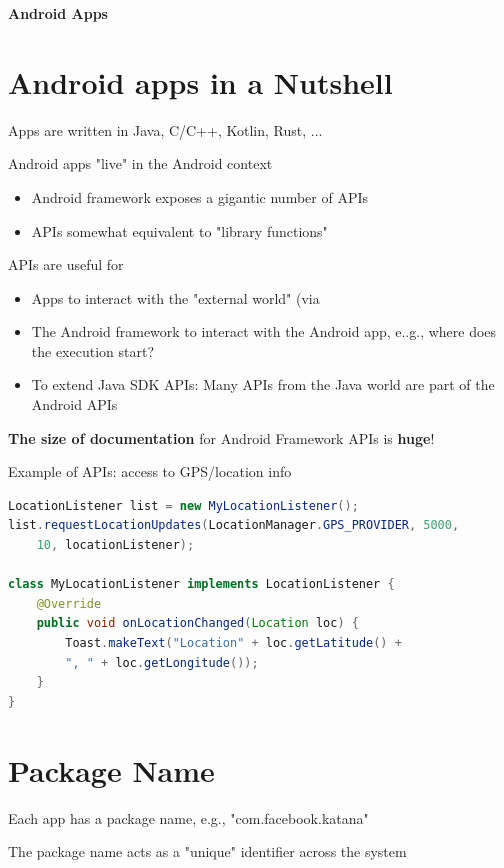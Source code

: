 \documentclass[11pt]{article}
\begin{document}
\newpage
\begin{center}
  {\LARGE \textbf{Android Apps}}
\end{center}
\vspace{0.5cm}

\section*{Android apps in a Nutshell}

Apps are written in Java, C/C++, Kotlin, Rust, ...

Android apps "live" in the Android context
\begin{itemize}
	\item Android framework exposes a gigantic number of APIs
	\item APIs somewhat equivalent to "library functions"
\end{itemize}

APIs are useful for
\begin{itemize}
	\item Apps to interact with the "external world" (via
	\item The Android framework to interact with the Android app, e..g., where does the execution start?
	\item To extend Java SDK APIs: Many APIs from the Java world are part of the Android APIs 
\end{itemize}

\textbf{The size of documentation} for Android Framework APIs is \textbf{huge}!

Example of APIs: access to GPS/location info
\begin{lstlisting}[language=Java]
LocationListener list = new MyLocationListener();
list.requestLocationUpdates(LocationManager.GPS_PROVIDER, 5000,
	10, locationListener);

class MyLocationListener implements LocationListener {
	@Override
	public void onLocationChanged(Location loc) {
		Toast.makeText("Location" + loc.getLatitude() +
		", " + loc.getLongitude());
	}
}
\end{lstlisting}

\section*{Package Name}

Each app has a package name, e.g., "com.facebook.katana"

The package name acts as a "unique" identifier across the system
\end{document}
